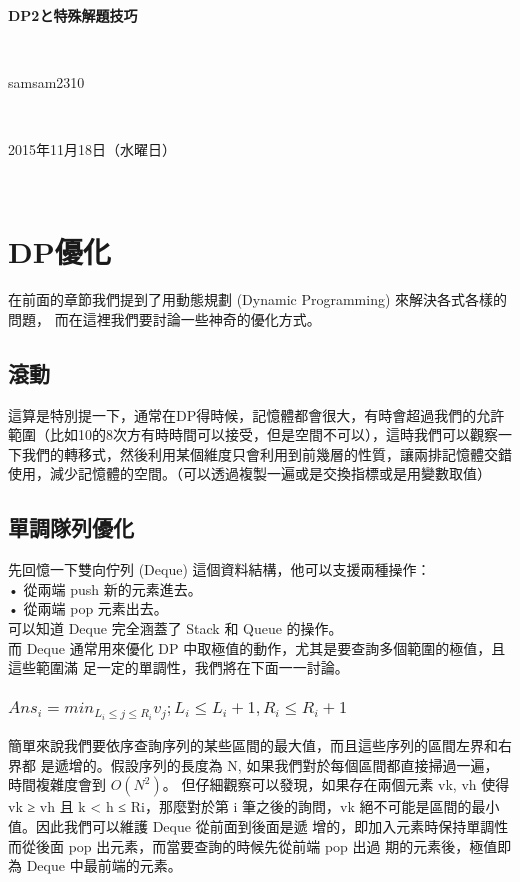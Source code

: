 \documentclass{article}
\title{\hmwkClass}
\author{\hmwkAuthorName}
\date{\hmwkDueDate}
\def\normalsize{\fontsize{12}{16}\selectfont}
\def\large{\fontsize{16}{24}\selectfont}
\def\LARGE{\fontsize{24}{36}\selectfont}
\newcommand{\hmwkDueDate}{2015年11月18日（水曜日）} %
\newcommand{\hmwkClass}{DP2と特殊解題技巧} %
\newcommand{\hmwkAuthorName}{samsam2310} %
\begin{document}
\LARGE~\\[4ex]
\centerline{\bf\hmwkClass}\large\\[2ex]\centerline{\hmwkAuthorName}\\[2ex]\centerline{\hmwkDueDate}\\
\normalsize


\section{DP優化}

在前面的章節我們提到了用動態規劃 (Dynamic Programming) 來解決各式各樣的問題，
而在這裡我們要討論一些神奇的優化方式。

\subsection{滾動}
這算是特別提一下，通常在DP得時候，記憶體都會很大，有時會超過我們的允許範圍（比如10的8次方有時時間可以接受，但是空間不可以），這時我們可以觀察一下我們的轉移式，然後利用某個維度只會利用到前幾層的性質，讓兩排記憶體交錯使用，減少記憶體的空間。（可以透過複製一遍或是交換指標或是用變數取值）

\subsection{單調隊列優化}
先回憶一下雙向佇列 (Deque) 這個資料結構，他可以支援兩種操作：\\
• 從兩端 push 新的元素進去。\\
• 從兩端 pop 元素出去。\\
可以知道 Deque 完全涵蓋了 Stack 和 Queue 的操作。\\
而 Deque 通常用來優化 DP 中取極值的動作，尤其是要查詢多個範圍的極值，且這些範圍滿
足一定的單調性，我們將在下面一一討論。
\subsubsection{$Ans_i = min_{L_i ≤ j ≤ R_i}v_j ; L_i ≤ L_i +1, R_i ≤ R_i +1 $}
簡單來說我們要依序查詢序列的某些區間的最大值，而且這些序列的區間左界和右界都
是遞增的。假設序列的長度為 N, 如果我們對於每個區間都直接掃過一遍，時間複雜度會到
$O(N^2)$。
但仔細觀察可以發現，如果存在兩個元素 vk, vh 使得 vk ≥ vh 且 k < h ≤ Ri，那麼對於第 i
筆之後的詢問，vk 絕不可能是區間的最小值。因此我們可以維護 Deque 從前面到後面是遞
增的，即加入元素時保持單調性而從後面 pop 出元素，而當要查詢的時候先從前端 pop 出過
期的元素後，極值即為 Deque 中最前端的元素。
\end{document}
